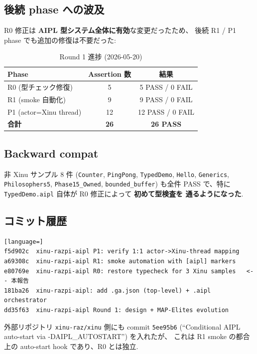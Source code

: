 \documentclass[11pt,a4paper]{article}
\begin{document}
\subsection{後続 phase への波及}

R0 修正は\textbf{ AIPL 型システム全体に有効}な変更だったため、
後続 R1 / P1 phase でも追加の修復は不要だった:

\begin{table}[h]
\centering
\small
\begin{tabular}{lcc}
\toprule
Phase & Assertion 数 & 結果 \\
\midrule
R0 (型チェック修復)        & 5 & 5 PASS / 0 FAIL \\
R1 (smoke 自動化)           & 9 & 9 PASS / 0 FAIL \\
P1 (actor=Xinu thread)      & 12 & 12 PASS / 0 FAIL \\
\midrule
\textbf{合計}               & \textbf{26} & \textbf{26 PASS} \\
\bottomrule
\end{tabular}
\caption{Round 1 進捗 (2026-05-20)}
\end{table}

\subsection{Backward compat}

非 Xinu サンプル 8 件
(\texttt{Counter}, \texttt{PingPong}, \texttt{TypedDemo}, \texttt{Hello},
 \texttt{Generics}, \texttt{Philosophers5}, \texttt{Phase15\_Owned},
 \texttt{bounded\_buffer}) も全件 PASS で、特に\texttt{
TypedDemo.aipl} 自体が R0 修正によって\textbf{ 初めて型検査を
通るようになった}.

\subsection{コミット履歴}

\begin{lstlisting}[language=]
f5d902c  xinu-razpi-aipl P1: verify 1:1 actor->Xinu-thread mapping
a69308c  xinu-razpi-aipl R1: smoke automation with [aipl] markers
e80769e  xinu-razpi-aipl R0: restore typecheck for 3 Xinu samples   <-- 本報告
181ba26  xinu-razpi-aipl: add .ga.json (top-level) + .aipl orchestrator
dd35f63  xinu-razpi-aipl Round 1: design + MAP-Elites evolution
\end{lstlisting}

外部リポジトリ \texttt{xinu-raz/xinu} 側にも commit \texttt{5ee95b6}
(``Conditional AIPL auto-start via -DAIPL\_AUTOSTART'') を入れたが、
これは R1 smoke の都合上の auto-start hook であり、R0 とは独立.
\end{document}
